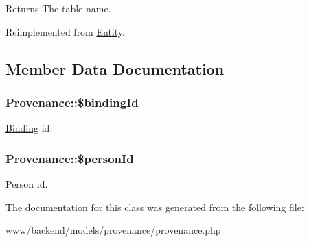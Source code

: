 \begin{DoxyReturn}{Returns}
The table name. 
\end{DoxyReturn}


Reimplemented from \hyperlink{classEntity_a8305fd94740ac62cbafb9de76567ce37}{Entity}.



\subsection{Member Data Documentation}
\hypertarget{classProvenance_a908380e16902473484d18fc79fa65290}{
\subsubsection[{\$bindingId}]{\setlength{\rightskip}{0pt plus 5cm}Provenance::\$bindingId}}
\label{classProvenance_a908380e16902473484d18fc79fa65290}
\hyperlink{classBinding}{Binding} id. \hypertarget{classProvenance_a0f541d6de88ef1a2c57a0aa462fcdc8b}{
\subsubsection[{\$personId}]{\setlength{\rightskip}{0pt plus 5cm}Provenance::\$personId}}
\label{classProvenance_a0f541d6de88ef1a2c57a0aa462fcdc8b}
\hyperlink{classPerson}{Person} id. 

The documentation for this class was generated from the following file:\begin{DoxyCompactItemize}
\item 
www/backend/models/provenance/provenance.php\end{DoxyCompactItemize}
